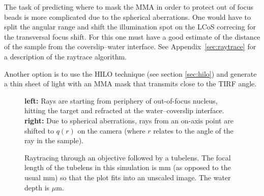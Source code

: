 The task of predicting where to mask the MMA in order to protect out
of focus beads is more complicated due to the spherical
aberrations. One would have to split the angular range and shift the
illumination spot on the LCoS correcing for the transversal focus
shift. For this one must have a good estimate of the distance of the
sample from the coverslip--water interface. See
Appendix~\ref{sec:raytrace} for a description of the raytrace
algorithm.

Another option is to use the HILO technique (see section
\ref{sec:hilo}) and generate a thin sheet of light with an MMA mask
that transmits close to the TIRF angle.


\begin{figure}[!hbt]
  \centering
  \def\svgscale{.3}
  
  
  \caption{{\bf left:} Rays are starting from periphery of
    out-of-focus nucleus, hitting the target and refracted at the
    water--coverslip interface. {\bf right:} Due to spherical
    aberrations, rays from an on-axis point are shifted to $q(r)$ on
    the camera (where $r$ relates to the angle of the ray in the
    sample). }
\end{figure}

\begin{figure}[!hbt]
  \centering
  \def\svgscale{.3}
  
  \caption{}
\end{figure}
 
\begin{figure}[!hbt]
  \centering
  \caption{Raytracing through an objective followed by a tubelens. The
    focal length of the tubelens in this simulation is \unit[16]{mm}
    (as opposed to the usual \unit[160]{mm}) so that the plot fits
    into an unscaled image. The water depth is \unit[10]{$\mu$m}.}
  \label{fig:screen_microscope-aberrate-front}
\end{figure}

